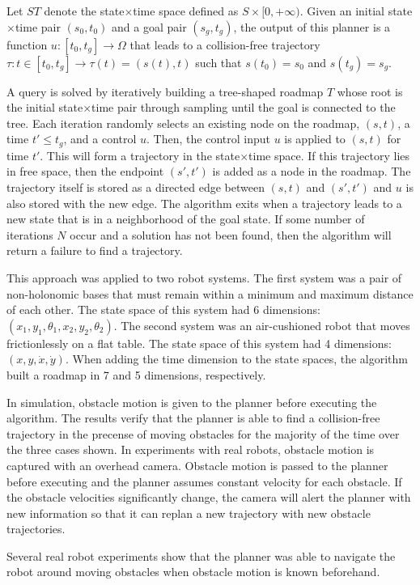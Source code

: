 Let $ST$ denote the state$\times$time space defined as $S\times[0,+\infty)$. Given an initial state$\times$time pair $(s_0, t_0)$ and a goal pair $(s_g, t_g)$, the output of this planner is a function $u:[t_0, t_g] \rightarrow \Omega$ that leads to a collision-free trajectory $\tau: t \in [t_0, t_g] \rightarrow \tau(t) = (s(t),t)$ such that $s(t_0)=s_0$ and $s(t_g)=s_g$.

A query is solved by iteratively building a tree-shaped roadmap $T$ whose root is the initial state$\times$time pair through sampling until the goal is connected to the tree. Each iteration randomly selects an existing node on the roadmap, $(s,t)$, a time $t' \leq t_g$, and a control $u$. Then, the control input $u$ is applied to $(s,t)$ for time $t'$. This will form a trajectory in the state$\times$time space. If this trajectory lies in free space, then the endpoint $(s',t')$ is added as a node in the roadmap. The trajectory itself is stored as a directed edge between $(s,t)$ and $(s',t')$ and $u$ is also stored with the new edge. The algorithm exits when a trajectory leads to a new state that is in a neighborhood of the goal state. If some number of iterations $N$ occur and a solution has not been found, then the algorithm will return a failure to find a trajectory.

This approach was applied to two robot systems. The first system was a pair of non-holonomic bases that must remain within a minimum and maximum distance of each other. The state space of this system had 6 dimensions: $(x_1, y_1, \theta_1, x_2, y_2, \theta_2)$. The second system was an air-cushioned robot that moves frictionlessly on a flat table. The state space of this system had 4 dimensions: $(x, y, \dot{x}, \dot{y})$. When adding the time dimension to the state spaces, the algorithm built a roadmap in 7 and 5 dimensions, respectively.

In simulation, obstacle motion is given to the planner before executing the algorithm. The results verify that the planner is able to find a collision-free trajectory in the precense of moving obstacles for the majority of the time over the three cases shown. In experiments with real robots, obstacle motion is captured with an overhead camera. Obstacle motion is passed to the planner before executing and the planner assumes constant velocity for each obstacle. If the obstacle velocities significantly change, the camera will alert the planner with new information so that it can replan a new trajectory with new obstacle trajectories.

Several real robot experiments show that the planner was able to navigate the robot around moving obstacles when obstacle motion is known beforehand.